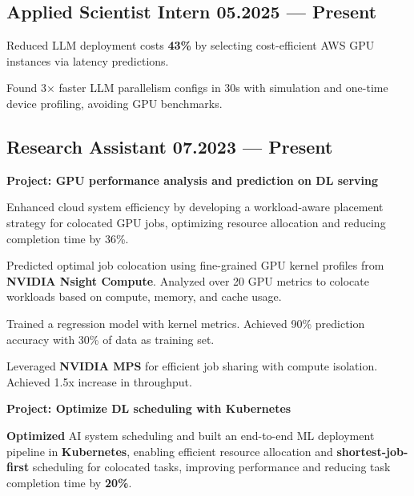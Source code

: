 \subsection{{Applied Scientist Intern \hfill 05.2025 --- Present}}
\begin{zitemize}
        \item Reduced LLM deployment costs \textbf{43\%} by selecting cost-efficient AWS GPU instances via latency predictions.
        \item Found 3× faster LLM parallelism configs in 30s with simulation and one-time device profiling, avoiding GPU benchmarks.
\end{zitemize}

\subsection{{Research Assistant \hfill 07.2023 --- Present}}

\begin{zitemize}
        \item \textbf{Project: GPU performance analysis and prediction on DL serving}
        \item Enhanced cloud system efficiency by developing a workload-aware placement strategy for colocated GPU jobs, optimizing resource allocation and reducing completion time by 36\%.
        \item Predicted optimal job colocation using fine-grained GPU kernel profiles from \textbf{NVIDIA Nsight Compute}. Analyzed over 20 GPU metrics to colocate workloads based on compute, memory, and cache usage.
        \item Trained a regression model with kernel metrics. Achieved 90\% prediction accuracy with 30\% of data as training set.
        \item Leveraged \textbf{NVIDIA MPS} for efficient job sharing with compute isolation. Achieved 1.5x increase in throughput.
\end{zitemize}
\vspace{-1.5pt}
\begin{zitemize}
        \item \textbf{Project: Optimize DL scheduling with Kubernetes}
        \item \textbf{Optimized} AI system scheduling and built an end-to-end ML deployment pipeline in \textbf{Kubernetes}, enabling efficient resource allocation and \textbf{shortest-job-first} scheduling for colocated tasks, improving performance and reducing task completion time by \textbf{20\%}.

\end{zitemize}

